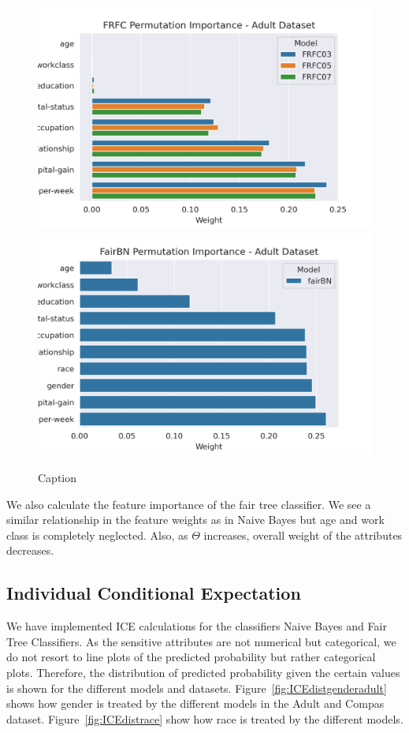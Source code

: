 \begin{figure}
    \centering
    \includegraphics{figures/frfc-permimportance-adult.png}
    \includegraphics[width=\linewidth]{figures/fairbn-permimportance-adult.png}
    \caption{Caption}
    \label{fig:my_label}
\end{figure}

We also calculate the feature importance of the fair tree classifier. We see a similar relationship in the feature weights as in Naive Bayes but age and work class is completely neglected. Also, as $\Theta$ increases, overall weight of the attributes decreases. 

\subsection{Individual Conditional Expectation}

We have implemented ICE calculations for the classifiers Naive Bayes and Fair Tree Classifiers. As the sensitive attributes are not numerical but categorical, we do not resort to line plots of the predicted probability but rather categorical plots. Therefore, the distribution of predicted probability given the certain values is shown for the different models and datasets. Figure~\ref{fig:ICEdistgenderadult} shows how gender is treated by the different models in the Adult and Compas dataset. Figure~\ref{fig:ICEdistrace} show how race is treated by the different models.

